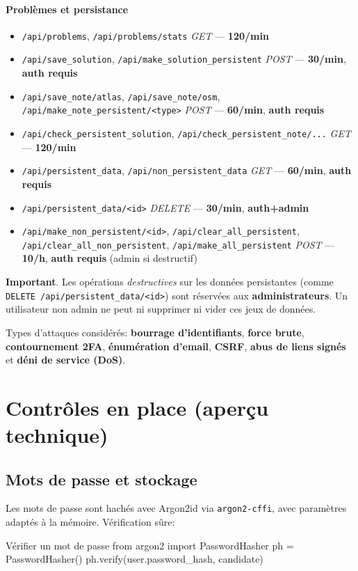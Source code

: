 \paragraph{Problèmes et persistance}
\begin{itemize}
  \item \texttt{/api/problems}, \texttt{/api/problems/stats} \textit{GET} — \textbf{120/min}
  \item \texttt{/api/save\_solution}, \texttt{/api/make\_solution\_persistent} \textit{POST} — \textbf{30/min}, \textbf{auth requis}
  \item \texttt{/api/save\_note/atlas}, \texttt{/api/save\_note/osm}, \texttt{/api/make\_note\_persistent/<type>} \textit{POST} — \textbf{60/min}, \textbf{auth requis}
  \item \texttt{/api/check\_persistent\_solution}, \texttt{/api/check\_persistent\_note/...} \textit{GET} — \textbf{120/min}
  \item \texttt{/api/persistent\_data}, \texttt{/api/non\_persistent\_data} \textit{GET} — \textbf{60/min}, \textbf{auth requis}
  \item \texttt{/api/persistent\_data/<id>} \textit{DELETE} — \textbf{30/min}, \textbf{auth+admin}
  \item \texttt{/api/make\_non\_persistent/<id>}, \texttt{/api/clear\_all\_persistent}, \texttt{/api/clear\_all\_non\_persistent}, \texttt{/api/make\_all\_persistent} \textit{POST} — \textbf{10/h}, \textbf{auth requis} (admin si destructif)
\end{itemize}

\noindent \textbf{Important}. Les opérations \emph{destructives} sur les données persistantes (comme \texttt{DELETE /api/persistent\_data/<id>}) sont réservées aux \textbf{administrateurs}. Un utilisateur non admin ne peut ni supprimer ni vider ces jeux de données.

\noindent Types d'attaques considérés: \textbf{bourrage d'identifiants}, \textbf{force brute}, \textbf{contournement 2FA}, \textbf{énumération d'email}, \textbf{CSRF}, \textbf{abus de liens signés} et \textbf{déni de service (DoS)}.

\section{Contrôles en place (aperçu technique)}

\subsection*{Mots de passe et stockage}
\noindent Les mots de passe sont hachés avec Argon2id via \texttt{argon2-cffi}, avec paramètres adaptés à la mémoire. Vérification sûre:
\begin{codebox}[language=Python]{Vérifier un mot de passe}
from argon2 import PasswordHasher
ph = PasswordHasher()
ph.verify(user.password_hash, candidate)
\end{codebox}

